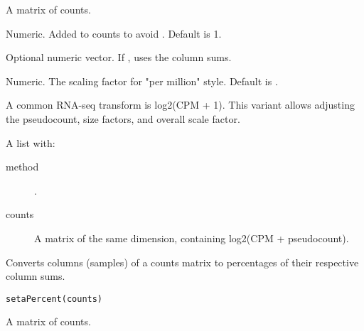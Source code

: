 \documentclass[a4paper]{book}
\begin{document}
%
\begin{Arguments}
\begin{ldescription}
\item[\code{counts}] A matrix of counts.

\item[\code{pseudocount}] Numeric. Added to counts to avoid . Default is 1.

\item[\code{size\_factors}] Optional numeric vector. If , uses the column sums.

\item[\code{scale\_factor}] Numeric. The scaling factor for "per million" style. Default is .
\end{ldescription}
\end{Arguments}
%
\begin{Details}
A common RNA-seq transform is log2(CPM + 1). This variant allows adjusting the
pseudocount, size factors, and overall scale factor.
\end{Details}
%
\begin{Value}
A list with:
\begin{description}

\item[method] .
\item[counts] A matrix of the same dimension, containing log2(CPM + pseudocount).

\end{description}

\end{Value}
%
\begin{Examples}
\end{Examples}
%
\begin{Description}
Converts columns (samples) of a counts matrix to percentages of their respective column sums.
\end{Description}
%
\begin{Usage}
\begin{verbatim}
setaPercent(counts)
\end{verbatim}
\end{Usage}
%
\begin{Arguments}
\begin{ldescription}
\item[\code{counts}] A matrix of counts.
\end{ldescription}
\end{Arguments}
\end{document}
